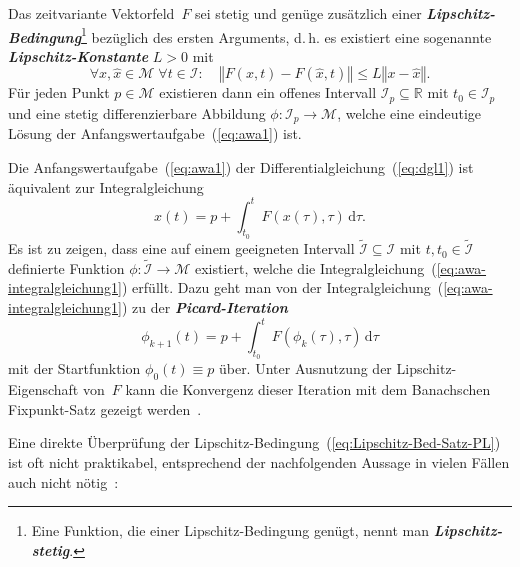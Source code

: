 \begin{theorem}
\label{thm:Picard-Lindeloeff}Das
zeitvariante Vektorfeld~$F$ sei stetig und genüge zusätzlich einer\textbf{\em
Lipschitz-Bedingung}\footnote{Eine Funktion, die einer Lipschitz-Bedingung genügt, nennt man \textbf{\em Lipschitz-stetig}.}
bezüglich des ersten Arguments, d.\,h. es existiert eine sogenannte
\textbf{\em Lipschitz-Konstante} $L>0$ mit
\begin{equation}
\forall x,\hat{x}\in\mathcal{M}\;\forall t\in\mathcal{I}:\quad\left\Vert F(x,t)-F(\hat{x},t)\right\Vert \leq L\left\Vert x-\hat{x}\right\Vert .\label{eq:Lipschitz-Bed-Satz-PL}
\end{equation}
Für jeden Punkt $p\in\mathcal{M}$ existieren dann ein offenes Intervall
$\mathcal{I}_{p}\subseteq{\mathbb{R}}$ mit $t_{0}\in\mathcal{I}_{p}$ und eine
stetig differenzierbare Abbildung $\phi:\mathcal{I}_{p}\to\mathcal{M}$,
welche eine eindeutige Lösung der Anfangswertaufgabe~(\ref{eq:awa1})
ist.
\end{theorem}
\begin{proofsketch}Die Anfangswertaufgabe~(\ref{eq:awa1}) der Differentialgleichung~(\ref{eq:dgl1})
ist äquivalent zur Integralgleichung
\begin{equation}
x(t)=p+\int_{t_{0}}^{t}F(x(\tau),\tau)\,{\mathrm{d}}\tau.\label{eq:awa-integralgleichung1}
\end{equation}
Es ist zu zeigen, dass eine auf einem geeigneten Intervall $\tilde{\mathcal{I}}\subseteq\mathcal{I}$
mit $t,t_{0}\in\tilde{\mathcal{I}}$ definierte Funktion $\phi:\tilde{\mathcal{I}}\to\mathcal{M}$
existiert, welche die Integralgleichung~(\ref{eq:awa-integralgleichung1})
erfüllt. Dazu geht man von der Integralgleichung~(\ref{eq:awa-integralgleichung1})
zu der \textbf{\em Picard-Iteration}
\begin{equation}
\phi_{k+1}(t)=p+\int_{t_{0}}^{t}F(\phi_{k}(\tau),\tau)\,{\mathrm{d}}\tau\label{eq:picard-iteration}
\end{equation}
mit der Startfunktion $\phi_{0}(t)\equiv p$ über. Unter Ausnutzung
der Lipschitz-Eigenschaft von~$F$ kann die Konvergenz dieser Iteration
mit dem Banachschen Fixpunkt-Satz gezeigt werden~\cite[§~31]{arnold2001}.\end{proofsketch}

Eine direkte Überprüfung der Lipschitz-Bedingung~(\ref{eq:Lipschitz-Bed-Satz-PL})
ist oft nicht praktikabel, entsprechend der nachfolgenden Aussage
in vielen Fällen auch nicht nötig~\cite[Abschn.~{4.2}]{koenigsberger2-2004}:

